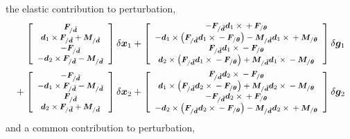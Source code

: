 \documentclass[10pt,fleqn,subeqn]{report}
\newcommand{\T}[1]{\bm{#1}}
\begin{document}
%
%
%
the elastic contribution to perturbation,
\begin{align}
	\footnotesize
	\sqbr{\cvvect{
		\T{F}_{/\tilde{\T{d}}} \\
		\T{d}_1 \times \T{F}_{/\tilde{\T{d}}}
			+ \T{M}_{/\tilde{\T{d}}} \\
		- \T{F}_{/\tilde{\T{d}}} \\
		- \T{d}_2 \times \T{F}_{/\tilde{\T{d}}} 
			- \T{M}_{/\tilde{\T{d}}}
	}} \delta\T{x}_1
%
	+ \sqbr{\cvvect{
		- \T{F}_{/\tilde{\T{d}}} \T{d}_1 \times{}
			+ \T{F}_{/\T{\theta}} \\
		- \T{d}_1 \times \plbr{
			\T{F}_{/\tilde{\T{d}}} \T{d}_1 \times{}
			- \T{F}_{/\T{\theta}}
		}
			- \T{M}_{/\tilde{\T{d}}} \T{d}_1\times{}
			+ \T{M}_{/\T{\theta}} \\
		\T{F}_{/\tilde{\T{d}}} \T{d}_1 \times{}
			- \T{F}_{/\T{\theta}} \\
		\T{d}_2 \times \plbr{
			\T{F}_{/\tilde{\T{d}}} \T{d}_1 \times{}
			- \T{F}_{/\T{\theta}}
		}
			+ \T{M}_{/\tilde{\T{d}}} \T{d}_1\times{}
			- \T{M}_{/\T{\theta}}
	}} \delta\T{g}_1
	& \nonumber \\
%
	\footnotesize
	\mbox{} 
	+ \sqbr{\cvvect{
		- \T{F}_{/\tilde{\T{d}}} \\
		- \T{d}_1 \times \T{F}_{/\tilde{\T{d}}}
			- \T{M}_{/\tilde{\T{d}}} \\
		\T{F}_{/\tilde{\T{d}}} \\
		\T{d}_2 \times \T{F}_{/\tilde{\T{d}}}
			+ \T{M}_{/\tilde{\T{d}}}
	}} \delta\T{x}_2
%
	+ \sqbr{\cvvect{
		\T{F}_{/\tilde{\T{d}}} \T{d}_2 \times{}
			- \T{F}_{/\T{\theta}} \\
		\T{d}_1 \times \plbr{
			\T{F}_{/\tilde{\T{d}}} \T{d}_2 \times{}
			- \T{F}_{/\T{\theta}}
		}
			+ \T{M}_{/\tilde{\T{d}}} \T{d}_2\times{}
			- \T{M}_{/\T{\theta}} \\
		- \T{F}_{/\tilde{\T{d}}} \T{d}_2 \times{}
			+ \T{F}_{/\T{\theta}} \\
		- \T{d}_2 \times \plbr{
			\T{F}_{/\tilde{\T{d}}} \T{d}_2 \times{}
			- \T{F}_{/\T{\theta}}
		}
			- \T{M}_{/\tilde{\T{d}}} \T{d}_2\times{}
			+ \T{M}_{/\T{\theta}}
	}} \delta\T{g}_2
	&
	\label{eq:deformable-joint-perturb-elastic}
\end{align}
%
%
%
and a common contribution to perturbation,
\end{document}
